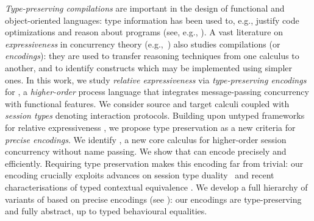 

\emph{Type-preserving compilations} are important in the design of
functional and object-oriented languages: type information has been
used to, e.g., justify code optimizations and reason about programs
(see, e.g.,
\cite{DBLP:journals/toplas/MorrisettWCG99,DBLP:conf/pldi/ShaoA95,DBLP:journals/toplas/LeagueST02}).
A vast literature on 
{\em expressiveness} 
in concurrency theory  
(e.g.,~\cite{Palamidessi03,DBLP:journals/iandc/Gorla10,DBLP:conf/icalp/LanesePSS10})
also studies compilations (or \emph{encodings}):
they are used to transfer reasoning techniques 
from one calculus to another, and to identify 
constructs which may be implemented
using simpler ones. 
In this work, we study 
{\em relative expressiveness} 
via \emph{type-preserving encodings} for \HOp, a \emph{higher-order} 
process language that integrates message-passing concurrency with functional features.
We consider source and target calculi coupled with \emph{session types} denoting interaction protocols. 
Building upon untyped frameworks for relative expressiveness
\cite{DBLP:journals/iandc/Gorla10}, 
we propose type preservation as a {new criteria} for \emph{precise encodings}.
We identify \HO, a new core calculus for higher-order session concurrency without
name passing. 
We show that \HO can encode \HOp precisely and efficiently. 
Requiring  
type preservation makes
this encoding far from trivial: our encoding crucially exploits advances on
session type duality~\cite{TGC14,DBLP:journals/corr/abs-1202-2086} and recent
characterisations of typed contextual equivalence \cite{characteristic_bis}.
We develop a full hierarchy of variants of \HOp based on 
precise encodings (see ):
our encodings are
type-preserving and fully abstract, up to typed
behavioural equalities. 

